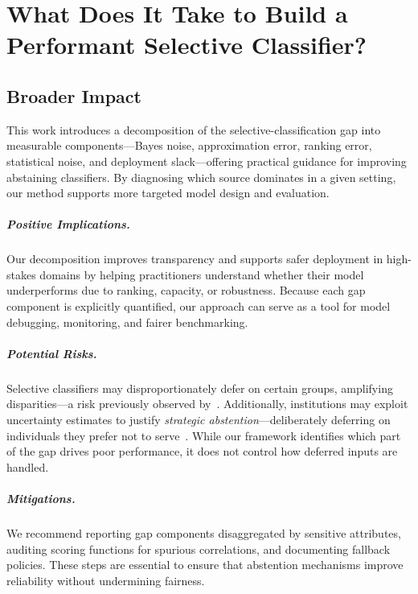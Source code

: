 \chapter{What Does It Take to Build a Performant Selective Classifier?}

\section{Broader Impact}
\label{sec:broader_impact}

This work introduces a decomposition of the selective-classification gap into measurable components—Bayes noise, approximation error, ranking error, statistical noise, and deployment slack—offering practical guidance for improving abstaining classifiers. By diagnosing which source dominates in a given setting, our method supports more targeted model design and evaluation.

\paragraph{Positive Implications.}
Our decomposition improves transparency and supports safer deployment in high-stakes domains by helping practitioners understand whether their model underperforms due to ranking, capacity, or robustness. Because each gap component is explicitly quantified, our approach can serve as a tool for model debugging, monitoring, and fairer benchmarking.

\paragraph{Potential Risks.}
Selective classifiers may disproportionately defer on certain groups, amplifying disparities—a risk previously observed by~\citet{jones2020selective}. Additionally, institutions may exploit uncertainty estimates to justify \emph{strategic abstention}—deliberately deferring on individuals they prefer not to serve~\citep{rabanser2025confidential}. While our framework identifies which part of the gap drives poor performance, it does not control how deferred inputs are handled.

\paragraph{Mitigations.}
We recommend reporting gap components disaggregated by sensitive attributes, auditing scoring functions for spurious correlations, and documenting fallback policies. These steps are essential to ensure that abstention mechanisms improve reliability without undermining fairness.

